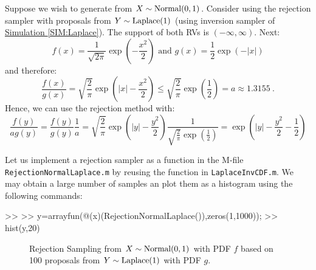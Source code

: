 \begin{simulation}\label{SIM:Normal01FromLaplace}
Suppose we wish to generate from $X \sim \mbox{{\rm Normal}}(0, 1)$. Consider using the rejection sampler with proposals from $Y \sim \mbox{{\rm Laplace}}(1)$ (using inversion sampler of \hyperref[SIM:Laplace]{Simulation \ref*{SIM:Laplace}}). The support of both RVs is $(-\infty,\infty)$. Next:
$$f(x)=\frac{1}{\sqrt{2\pi}}\exp\left(-\frac{x^2}{2}\right) \textrm{ and } g(x)=\frac{1}{2}\exp(-|x|)$$
and therefore:
$$\frac{f(x)}{g(x)}=\sqrt{\frac{2}{\pi}}\exp\left(|x|-\frac{x^2}{2}\right)\leq \sqrt{\frac{2}{\pi}}\exp\left(\frac{1}{2}\right) = a \approx 1.3155 \ .$$
Hence, we can use the rejection method with:
$$
\frac{f(y)}{a g(y)} = \frac{f(y)}{g(y)} \frac{1}{a} = \sqrt{\frac{2}{\pi}}\exp\left(|y|-\frac{y^2}{2}\right) \frac{1}{\sqrt{\frac{2}{\pi}}\exp\left(\frac{1}{2}\right)  } = \exp\left(|y|-\frac{y^2}{2} - \frac{1}{2} \right)
$$

Let us implement a rejection sampler as a function in the M-file {\tt RejectionNormalLaplace.m} by reusing the function in {\tt LaplaceInvCDF.m}.
We may obtain a large number of samples an plot them as a histogram using the following commands:
\begin{VrbM}
>> %
>> y=arrayfun(@(x)(RejectionNormalLaplace()),zeros(1,1000));
>> hist(y,20) %
\end{VrbM}
\end{simulation}

\begin{figure}[htpb]
\caption{Rejection Sampling from $X \sim \mbox{{\rm Normal}}(0,1)$ with PDF $f$ based on  100 proposals from $Y \sim \mbox{{\rm Laplace}}(1)$ with PDF $g$.\label{F:RSNormalLaplace}}
\centering   {}
\end{figure}

